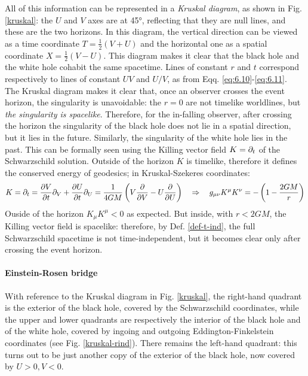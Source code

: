 All of this information can be represented in a \textit{Kruskal diagram}, as shown in Fig. \ref{kruskal}: the $ U $ and $ V $ axes are at 45°, reflecting that they are null lines, and these are the two horizons. In this diagram, the vertical direction can be viewed as a time coordinate $ T = \frac{1}{2} (V + U) $ and the horizontal one as a spatial coordinate $ X = \frac{1}{2} (V - U) $. This diagram makes it clear that the black hole and the white hole cohabit the same spacetime. Lines of constant $ r $ and $ t $ correspond respectively to lines of constant $ UV $ and $ U/V $, as from Eqq. \ref{eq:6.10}-\ref{eq:6.11}.\\
The Kruskal diagram makes it clear that, once an observer crosses the event horizon, the singularity is unavoidable: the $ r = 0 $ are not timelike worldlines, but \textit{the singularity is spacelike}. Therefore, for the in-falling observer, after crossing the horizon the singularity of the black hole does not lie in a spatial direction, but it lies in the future. Similarly, the singularity of the white hole lies in the past. This can be formally seen using the Killing vector field $ K = \partial_t $ of the Schwarzschild solution. Outside of the horizon $ K $ is timelike, therefore it defines the conserved energy of geodesics; in Kruskal-Szekeres coordinates:
\begin{equation*}
  K = \partial_t = \frac{\partial V}{\partial t} \partial_V + \frac{\partial U}{\partial t} \partial_U = \frac{1}{4GM} \left( V \frac{\partial}{\partial V} - U \frac{\partial}{\partial U} \right)
  \quad \Rightarrow \quad
  g_{\mu \nu} K^\mu K^\nu = - \left( 1 - \frac{2GM}{r} \right)
\end{equation*}
Ouside of the horizon $ K_\mu K^\mu < 0 $ as expected. But inside, with $ r < 2GM $, the Killing vector field is spacelike: therefore, by Def. \ref{def-t-ind}, the full Schwarzschild spacetime is not time-independent, but it becomes clear only after crossing the event horizon.

\paragraph{Einstein-Rosen bridge}

With reference to the Kruskal diagram in Fig. \ref{kruskal}, the right-hand quadrant is the exterior of the black hole, covered by the Schwarzschild coordinates, while the upper and lower quadrants are respectively the interior of the black hole and of the white hole, covered by ingoing and outgoing Eddington-Finkelstein coordinates (see Fig. \ref{kruskal-rind}). There remains the left-hand quadrant: this turns out to be just another copy of the exterior of the black hole, now covered by $ U > 0, V < 0 $.

